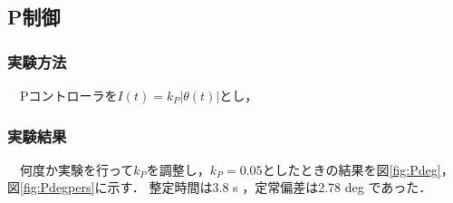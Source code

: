 \newpage

\subsection{P制御}
\subsubsection{実験方法}
　Pコントローラを$I(t) = k_P |\theta(t)|$とし，

\subsubsection{実験結果}
　何度か実験を行って$k_P$を調整し，$k_P=0.05$としたときの結果を図\ref{fig:Pdeg}，図\ref{fig:Pdegpers}に示す．
整定時間は3.8 s ，定常偏差は2.78 deg であった．

